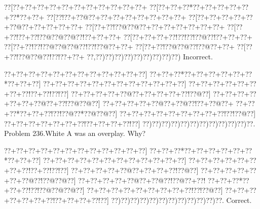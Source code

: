\documentclass[a5paper]{article}
\begin{document}
\begin{center}
{\goo
\0??[\0??+\0??+\0??+\0??+\0??+\0??+\0??+\0??+\0??+\0??+\0??+
\0??[\0??+\0??+\0??*\0??+\0??+\0??+\0??+\0??+\0??*\0??+\0??+
\0??[\0??!\0??+\0??@\0??+\0??+\0??+\0??+\0??+\0??+\0??+\0??+
\0??[\0??+\0??+\0??+\0??+\0??+\0??@\0??+\0??+\0??+\0??+\0??+
\0??[\0??+\0??!\0??@\0??@\0??+\0??+\0??+\0??+\0??+\0??+\0??+
\0??[\0??+\0??!\0??+\0??!\0??@\0??@\0??@\0??!\0??+\0??+\0??+
\0??[\0??+\0??+\0??+\0??!\0??!\0??!\0??@\0??!\0??+\0??+\0??+
\0??[\0??+\0??!\0??!\0??@\0??@\0??@\0??!\0??!\0??@\0??+\0??+
\0??[\0??+\0??!\0??@\0??@\0??!\0??@\0??+\0??+
\0??[\0??+\0??!\0??@\0??@\0??!\0??!\0??+\0??+
\0??,\0??)\0??)\0??)\0??)\0??)\0??)\0??)\0??)\0??)
}
Incorrect. 

\end{center}
\newpage
\begin{center}
{\goo
\0??+\0??+\0??+\0??+\0??+\0??+\0??+\0??+\0??+\0??+\0??+\0??]
\0??+\0??+\0??*\0??+\0??+\0??+\0??+\0??+\0??*\0??+\0??+\0??]
\0??+\0??+\0??+\0??+\0??+\0??+\0??+\0??+\0??+\0??+\0??+\0??]
\0??+\0??+\0??+\0??+\0??+\0??+\0??+\0??!\0??+\0??!\0??!\0??]
\0??+\0??+\0??+\0??+\0??@\0??+\0??+\0??+\0??+\0??!\0??@\0??]
\0??+\0??+\0??+\0??+\0??+\0??+\0??@\0??+\0??!\0??@\0??@\0??]
\0??+\0??+\0??+\0??+\0??@\0??+\0??@\0??!\0??+\0??@\0??+
\0??+\0??+\0??*\0??+\0??+\0??!\0??!\0??@\0??*\0??@\0??@\0??]
\0??+\0??+\0??+\0??+\0??+\0??+\0??+\0??+\0??!\0??!\0??@\0??]
\0??+\0??+\0??+\0??+\0??+\0??+\0??!\0??+\0??+\0??+\0??!\0??]
\0??)\0??)\0??)\0??)\0??)\0??)\0??)\0??)\0??)\0??)\0??)\0??.
}
Problem 236.White A was an overplay. Why?

\end{center}
\begin{center}
{\goo
\0??+\0??+\0??+\0??+\0??+\0??+\0??+\0??+\0??+\0??+\0??+\0??]
\0??+\0??+\0??*\0??+\0??+\0??+\0??+\0??+\0??*\0??+\0??+\0??]
\0??+\0??+\0??+\0??+\0??+\0??+\0??+\0??+\0??+\0??+\0??+\0??]
\0??+\0??+\0??+\0??+\0??+\0??+\0??+\0??!\0??+\0??!\0??!\0??]
\0??+\0??+\0??+\0??+\0??@\0??+\0??+\0??+\0??!\0??@\0??]
\0??+\0??+\0??+\0??+\0??+\0??+\0??@\0??!\0??@\0??@\0??]
\0??+\0??+\0??+\0??+\0??@\0??+\0??@\0??!\0??@\0??+\0??!
\0??+\0??+\0??*\0??+\0??+\0??!\0??!\0??@\0??@\0??@\0??]
\0??+\0??+\0??+\0??+\0??+\0??+\0??+\0??+\0??!\0??!\0??@\0??]
\0??+\0??+\0??+\0??+\0??+\0??+\0??!\0??+\0??+\0??+\0??!\0??]
\0??)\0??)\0??)\0??)\0??)\0??)\0??)\0??)\0??)\0??)\0??)\0??.
}
Correct. 

\end{center}
\end{document}
